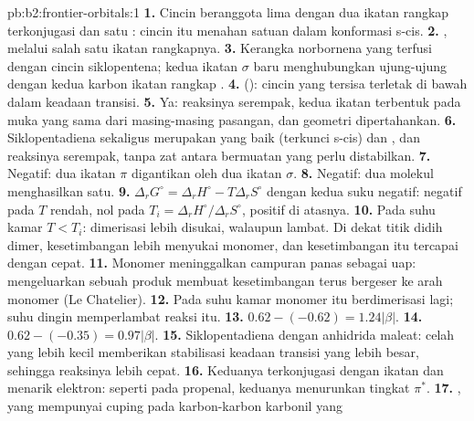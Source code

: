 \begin{solution}{pb:b2:frontier-orbitals:1}
\textbf{1.} Cincin beranggota lima dengan dua ikatan rangkap terkonjugasi
dan satu : cincin itu menahan satuan  dalam konformasi s-cis.
\textbf{2.} , melalui salah satu ikatan rangkapnya.
\textbf{3.} Kerangka norbornena yang terfusi dengan cincin siklopentena;
kedua ikatan $\sigma$ baru menghubungkan ujung-ujung  dengan kedua karbon
ikatan rangkap .
\textbf{4.}  (): cincin  yang tersisa terletak
di bawah  dalam keadaan transisi.
\textbf{5.} Ya: reaksinya serempak, kedua ikatan terbentuk pada muka yang
sama dari masing-masing pasangan, dan geometri  dipertahankan.
\textbf{6.} Siklopentadiena sekaligus merupakan  yang baik (terkunci
s-cis) dan , dan reaksinya serempak, tanpa zat antara bermuatan yang
perlu distabilkan.
\textbf{7.} Negatif: dua ikatan $\pi$ digantikan oleh dua ikatan $\sigma$.
\textbf{8.} Negatif: dua molekul menghasilkan satu.
\textbf{9.} $\Delta_r G^\circ = \Delta_r H^\circ - T\Delta_r S^\circ$ dengan kedua suku negatif: negatif
pada $T$ rendah, nol pada $T_i = \Delta_r H^\circ/\Delta_r S^\circ$, positif di atasnya.
\textbf{10.} Pada suhu kamar $T < T_i$: dimerisasi lebih disukai, walaupun
lambat. Di dekat titik didih dimer, kesetimbangan lebih menyukai monomer,
dan kesetimbangan itu tercapai dengan cepat.
\textbf{11.} Monomer meninggalkan campuran panas sebagai uap: mengeluarkan
sebuah produk membuat kesetimbangan terus bergeser ke arah monomer
(Le Chatelier).
\textbf{12.} Pada suhu kamar monomer itu berdimerisasi lagi; suhu dingin
memperlambat reaksi itu.
\textbf{13.} $0.62 - (-0.62) = 1.24|\beta|$.
\textbf{14.} $0.62 - (-0.35) = 0.97|\beta|$.
\textbf{15.} Siklopentadiena dengan anhidrida maleat: celah yang lebih kecil
memberikan stabilisasi keadaan transisi yang lebih besar, sehingga reaksinya
lebih cepat.
\textbf{16.} Keduanya terkonjugasi dengan ikatan  dan menarik
elektron: seperti pada propenal, keduanya menurunkan tingkat $\pi^*$.
\textbf{17.} , yang mempunyai cuping pada karbon-karbon karbonil yang

\end{solution}
